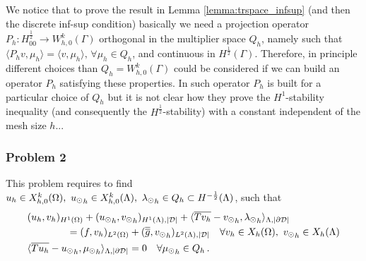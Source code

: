 {\color{red}
\begin{remark} We notice that to prove the result in Lemma \ref{lemma:trspace_infsup} (and then the discrete inf-sup condition)  basically we need a projection operator $P_h: H^{\frac 12}_{00} \longrightarrow W_{h,0}^k(\Gamma)$ orthogonal in the multiplier space $Q_h$, namely such that $\langle P_h v, \mu_h \rangle = \langle v, \mu_h \rangle, \, \forall \mu_h \in Q_h$, and continuous in $H^{\frac 12}(\Gamma)$. Therefore, in principle different choices than $Q_h=W_{h,0}^k(\Gamma)$ could be considered if we can build an operator $P_h$ satisfying these properties. In \cite{belgacem1999mortar} such operator $P_h$  is built for a particular choice of $Q_h$ but it is not clear how they prove the $H^1$-stability inequality (and consequently the $H^{\frac 12 }$-stability) with a constant independent of the mesh size $h$...
\end{remark}  
}
\subsubsection{Problem 2}
This problem requires to find  $u_h \in X_{h,0}^k(\Omega) ,\ {u_{\odot}}_h \in X_{h,0}^k(\Lambda), \ {\lambda_{\odot}}_h \in Q_h \subset H^{-\frac12}(\Lambda)$, such that
\begin{subequations}
\begin{align}\label{eq:prob2_discrete}
&(u_h,v_h)_{H^1(\Omega)} + ({\ud}_h,{\vd}_h)_{H^1(\Lambda), |{\cal D}|} 
+  \langle  \avrc{Tv_h} -  {\vd}_h, {\ld}_h \rangle_{\Lambda, |\DD|} 
\\
\nonumber
&\qquad\qquad= (f,v_h)_{L^2(\Omega)} + (\avrd{g},{\vd}_h)_{L^2(\Lambda), |{\cal D}|}
\quad \forall v_h \in X_h(\Omega), \ {\vd}_h \in X_h(\Lambda)
\\
&  \langle \avrc{T u_h} - {\ud}_h, {\md}_h \rangle_{\Lambda,| \DD| } = 0
\quad \forall {\md}_h \in Q_h\,.
\end{align}
\end{subequations}


